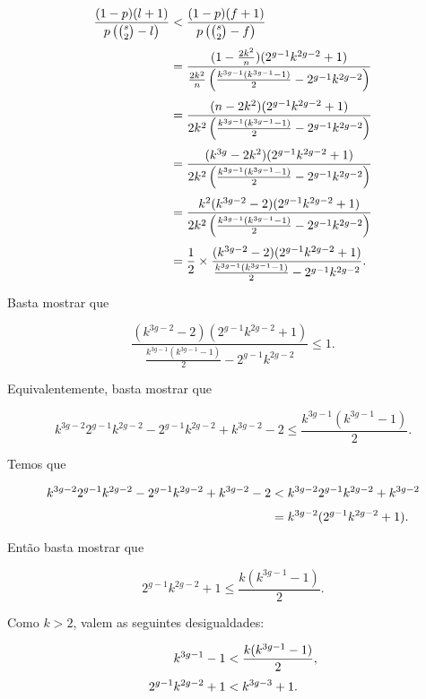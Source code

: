 \begin{equation*}
\setlength{\jot}{6pt}
\begin{aligned}
\frac{(1-p)(l+1)}{p\left(\binom{s}{2}-l\right)} &< \frac{(1-p)(f+1)}{p\left(\binom{s}{2}-f\right)} \\
&= \frac{(1-\frac{2k^2}{n})(2^{g-1}k^{2g-2}+1)}{\frac{2k^2}{n}\left(\frac{k^{3g-1}(k^{3g-1}-1)}{2}-2^{g-1}k^{2g-2}\right)} \\
&= \frac{(n-2k^2)(2^{g-1}k^{2g-2}+1)}{2k^2\left(\frac{k^{3g-1}(k^{3g-1}-1)}{2}-2^{g-1}k^{2g-2}\right)} \\
&= \frac{(k^{3g}-2k^2)(2^{g-1}k^{2g-2}+1)}{2k^2\left(\frac{k^{3g-1}(k^{3g-1}-1)}{2}-2^{g-1}k^{2g-2}\right)} \\
&= \frac{k^2(k^{3g-2}-2)(2^{g-1}k^{2g-2}+1)}{2k^2\left(\frac{k^{3g-1}(k^{3g-1}-1)}{2}-2^{g-1}k^{2g-2}\right)} \\
&= \frac{1}{2} \times \frac{(k^{3g-2}-2)(2^{g-1}k^{2g-2}+1)}{\frac{k^{3g-1}(k^{3g-1}-1)}{2}-2^{g-1}k^{2g-2}}.
\end{aligned}
\end{equation*}

Basta mostrar que 

\[\frac{(k^{3g-2}-2)(2^{g-1}k^{2g-2}+1)}{\frac{k^{3g-1}(k^{3g-1}-1)}{2}-2^{g-1}k^{2g-2}} \leq 1.\]

Equivalentemente, basta mostrar que %


\[k^{3g-2}2^{g-1}k^{2g-2}-2^{g-1}k^{2g-2} + k^{3g-2}-2 \leq \frac{k^{3g-1}(k^{3g-1}-1)}{2}.\]

Temos que

\begin{equation*}
\setlength{\jot}{6pt}
\begin{aligned}
k^{3g-2}2^{g-1}k^{2g-2}-2^{g-1}k^{2g-2} + k^{3g-2}-2 &< k^{3g-2}2^{g-1}k^{2g-2} + k^{3g-2} \\
&= k^{3g-2}(2^{g-1}k^{2g-2}+1).
\end{aligned}
\end{equation*}

Então basta mostrar que

\[2^{g-1}k^{2g-2}+1 \leq \frac{k(k^{3g-1}-1)}{2}.\]

Como $k>2$, valem as seguintes desigualdades:

\begin{equation*}
\setlength{\jot}{6pt}
\begin{aligned}
k^{3g-1}-1 &< \frac{k(k^{3g-1}-1)}{2}, \\
2^{g-1}k^{2g-2}+1 &< k^{3g-3}+1.
\end{aligned}
\end{equation*}

